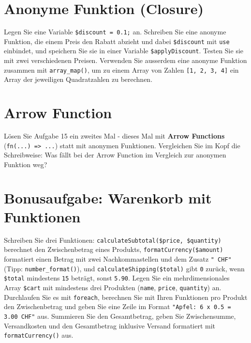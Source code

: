 \documentclass[a4paper,12pt]{article}
\begin{document}
\section{Anonyme Funktion (Closure)}

Legen Sie eine Variable \texttt{\$discount = 0.1;} an. Schreiben Sie eine anonyme Funktion, die einem Preis den Rabatt abzieht und dabei \texttt{\$discount} mit \texttt{use} einbindet, und speichern Sie sie in einer Variable \texttt{\$applyDiscount}. Testen Sie sie mit zwei verschiedenen Preisen. Verwenden Sie ausserdem eine anonyme Funktion zusammen mit \texttt{array\_map()}, um zu einem Array von Zahlen \texttt{[1, 2, 3, 4]} ein Array der jeweiligen Quadratzahlen zu berechnen.

\section{Arrow Function}

Lösen Sie Aufgabe 15 ein zweites Mal - dieses Mal mit \textbf{Arrow Functions} (\texttt{fn(...) => ...}) statt mit anonymen Funktionen. Vergleichen Sie im Kopf die Schreibweise: Was fällt bei der Arrow Function im Vergleich zur anonymen Funktion weg?

\section{Bonusaufgabe: Warenkorb mit Funktionen}

Schreiben Sie drei Funktionen: \texttt{calculateSubtotal(\$price, \$quantity)} berechnet den Zwischenbetrag eines Produkts, \texttt{formatCurrency(\$amount)} formatiert einen Betrag mit zwei Nachkommastellen und dem Zusatz \texttt{" CHF"} (Tipp: \texttt{number\_format()}), und \texttt{calculateShipping(\$total)} gibt \texttt{0} zurück, wenn \texttt{\$total} mindestens \texttt{15} beträgt, sonst \texttt{5.90}. Legen Sie ein mehrdimensionales Array \texttt{\$cart} mit mindestens drei Produkten (\texttt{name}, \texttt{price}, \texttt{quantity}) an. Durchlaufen Sie es mit \texttt{foreach}, berechnen Sie mit Ihren Funktionen pro Produkt den Zwischenbetrag und geben Sie eine Zeile im Format \texttt{"{}Apfel: 6 x 0.5 = 3.00 CHF"} aus. Summieren Sie den Gesamtbetrag, geben Sie Zwischensumme, Versandkosten und den Gesamtbetrag inklusive Versand formatiert mit \texttt{formatCurrency()} aus.
\end{document}
